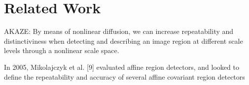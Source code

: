 \section{Related Work}
\label{sec:relatedwork}

AKAZE: By means of nonlinear diffusion, we can increase repeatability and distinctiviness when detecting and describing an image region at different scale levels through a nonlinear scale space. 

In 2005, Mikolajczyk et al. [9] evaluated affine region detectors, and looked to define the repeatability and accuracy of several affine covariant region detectors